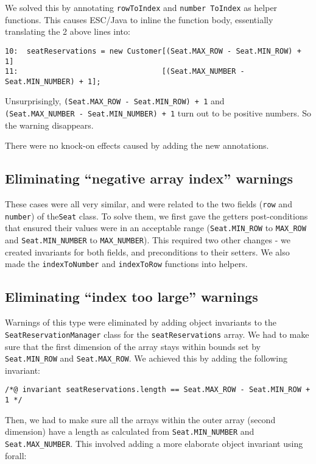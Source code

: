 \documentclass[11pt]{article}
\begin{document}
We solved this by annotating \verb|rowToIndex| and \verb|number ToIndex| as helper functions. This causes ESC/Java to inline the function body, essentially translating the 2 above lines into:

\noindent
\begin{verbatim}
10:  seatReservations = new Customer[(Seat.MAX_ROW - Seat.MIN_ROW) + 1]
11:                                 [(Seat.MAX_NUMBER - Seat.MIN_NUMBER) + 1];
\end{verbatim}

Unsurprisingly, \verb|(Seat.MAX_ROW - Seat.MIN_ROW) + 1| and \\
\verb|(Seat.MAX_NUMBER - Seat.MIN_NUMBER) + 1| turn out to be positive numbers. So the warning disappears.

There were no knock-on effects caused by adding the new annotations.

\subsection{Eliminating ``negative array index'' warnings}

These cases were all very similar, and were related to the two fields (\verb|row| and \verb|number|) of the\verb|Seat| class. To solve them, we first gave the getters post-conditions that ensured their values were in an acceptable range (\verb|Seat.MIN_ROW| to \verb|MAX_ROW| and \verb|Seat.MIN_NUMBER| to \verb|MAX_NUMBER|). This required two other changes - we created invariants for both fields, and preconditions to their setters. We also made the \verb|indexToNumber| and \verb|indexToRow| functions into helpers.

\subsection{Eliminating ``index too large'' warnings}

Warnings of this type were eliminated by adding object invariants to the \verb|SeatReservationManager| class for the \verb|seatReservations| array. We had to make sure that the first dimension of the array stays within bounds set by \verb|Seat.MIN_ROW| and \verb|Seat.MAX_ROW|. We achieved this by adding the following invariant:

\noindent
\begin{verbatim}
/*@ invariant seatReservations.length == Seat.MAX_ROW - Seat.MIN_ROW + 1 */
\end{verbatim}

Then, we had to make sure all the arrays within the outer array (second dimension) have a length as calculated from \verb|Seat.MIN_NUMBER| and \verb|Seat.MAX_NUMBER|. This involved adding a more elaborate object invariant using forall:
\end{document}
